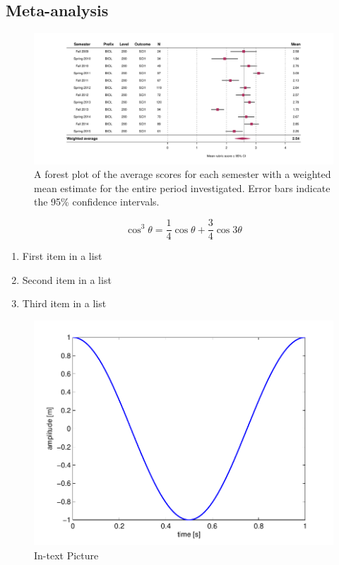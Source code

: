 \documentclass[fleqn,10pt]{SelfArx}\usepackage[]{graphicx}\usepackage[]{color}
\begin{document}
\lipsum[1]
\subsection{Meta-analysis}
\begin{figure}[ht]\centering %
\includegraphics[width=\linewidth]{forest}
\protect\caption{A forest plot of the average scores for each semester with a weighted mean estimate for the entire period investigated. Error bars indicate the 95\% confidence intervals.}
\label{fig:forest.pdf}
\end{figure}

\lipsum[1] %
\lipsum[1]

\begin{equation}
\cos^3 \theta =\frac{1}{4}\cos\theta+\frac{3}{4}\cos 3\theta
\label{eq:refname2}
\end{equation}

\lipsum[1] %

\begin{enumerate}[noitemsep] %
\item First item in a list
\item Second item in a list
\item Third item in a list
\end{enumerate}

\begin{figure}[ht]\centering
\includegraphics[width=\linewidth]{results}
\caption{In-text Picture}
\label{fig:results}
\end{figure}
\end{document}
